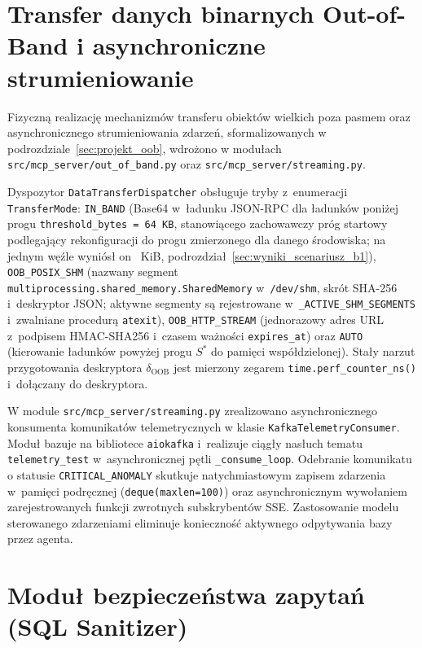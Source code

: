 \section{Transfer danych binarnych Out-of-Band i asynchroniczne strumieniowanie}
\label{sec:transfer_binarny_strumieniowanie}

Fizyczną realizację mechanizmów transferu obiektów wielkich poza pasmem oraz asynchronicznego strumieniowania zdarzeń, sformalizowanych w podrozdziale~\ref{sec:projekt_oob}, wdrożono w modułach \texttt{src/mcp\_server/out\_of\_band.py} oraz \texttt{src/mcp\_server/streaming.py}.

Dyspozytor \texttt{DataTransferDispatcher} obsługuje tryby z~enumeracji \texttt{TransferMode}: \texttt{IN\_BAND} (Base64 w~ładunku JSON-RPC dla ładunków poniżej progu \texttt{threshold\_bytes = 64 KB}, stanowiącego zachowawczy próg startowy podlegający rekonfiguracji do progu zmierzonego dla danego środowiska; na jednym węźle wyniósł on \wynSstarLoopShm~KiB, podrozdział~\ref{sec:wyniki_scenariusz_b1}), \texttt{OOB\_POSIX\_SHM} (nazwany segment \texttt{multiprocessing.shared\_memory.SharedMemory} w~\texttt{/dev/shm}, skrót SHA-256 i~deskryptor JSON; aktywne segmenty są rejestrowane w~\texttt{\_ACTIVE\_SHM\_SEGMENTS} i~zwalniane procedurą \texttt{atexit}), \texttt{OOB\_HTTP\_STREAM} (jednorazowy adres URL z~podpisem HMAC-SHA256 i~czasem ważności \texttt{expires\_at}) oraz \texttt{AUTO} (kierowanie ładunków powyżej progu $S^*$ do pamięci współdzielonej). Stały narzut przygotowania deskryptora $\delta_{\text{OOB}}$ jest mierzony zegarem \texttt{time.perf\_counter\_ns()} i~dołączany do deskryptora.

W module \texttt{src/mcp\_server/streaming.py} zrealizowano asynchronicznego konsumenta komunikatów telemetrycznych w klasie \texttt{KafkaTelemetryConsumer}. Moduł bazuje na bibliotece \texttt{aiokafka} i~realizuje ciągły nasłuch tematu \texttt{telemetry\_test} w~asynchronicznej pętli \texttt{\_consume\_loop}. Odebranie komunikatu o statusie \texttt{CRITICAL\_ANOMALY} skutkuje natychmiastowym zapisem zdarzenia w~pamięci podręcznej (\texttt{deque(maxlen=100)}) oraz asynchronicznym wywołaniem zarejestrowanych funkcji zwrotnych subskrybentów SSE. Zastosowanie modelu sterowanego zdarzeniami eliminuje konieczność aktywnego odpytywania bazy przez agenta.


\section{Moduł bezpieczeństwa zapytań (SQL Sanitizer)}
\label{sec:bezpieczenstwo_zapytan}

